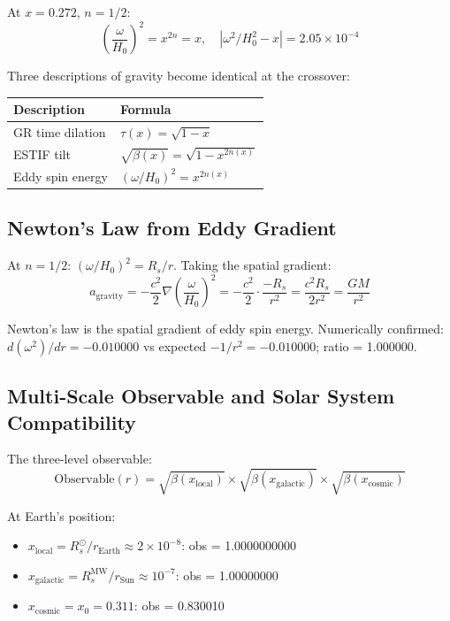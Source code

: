 \documentclass[12pt]{article}
\begin{document}
At $x = 0.272$, $n = 1/2$:
\begin{equation}
\left(\frac{\omega}{H_0}\right)^2 = x^{2n} = x, \quad |\omega^2/H_0^2 - x| = 2.05\times10^{-4}
\end{equation}

Three descriptions of gravity become identical at the crossover:
\begin{center}
\begin{tabular}{ll}
\toprule
Description & Formula \\
\midrule
GR time dilation & $\tau(x) = \sqrt{1-x}$ \\
ESTIF tilt & $\sqrt{\beta(x)} = \sqrt{1 - x^{2n(x)}}$ \\
Eddy spin energy & $(\omega/H_0)^2 = x^{2n(x)}$ \\
\bottomrule
\end{tabular}
\end{center}

\subsection{Newton's Law from Eddy Gradient}

At $n = 1/2$: $(\omega/H_0)^2 = R_s/r$. Taking the spatial gradient:
\begin{equation}
a_\text{gravity} = -\frac{c^2}{2}\nabla\!\left(\frac{\omega}{H_0}\right)^2
= -\frac{c^2}{2} \cdot \frac{-R_s}{r^2} = \frac{c^2 R_s}{2r^2} = \frac{GM}{r^2}
\end{equation}

Newton's law is the spatial gradient of eddy spin energy. Numerically confirmed:
$d(\omega^2)/dr = -0.010000$ vs expected $-1/r^2 = -0.010000$; ratio = 1.000000.

\subsection{Multi-Scale Observable and Solar System Compatibility}

The three-level observable:
\begin{equation}
\text{Observable}(r) = \sqrt{\beta(x_\text{local})} \times \sqrt{\beta(x_\text{galactic})} \times \sqrt{\beta(x_\text{cosmic})}
\end{equation}

At Earth's position:
\begin{itemize}
\item $x_\text{local} = R_s^\odot / r_\text{Earth} \approx 2\times10^{-8}$: obs = 1.0000000000
\item $x_\text{galactic} = R_s^\text{MW} / r_\text{Sun} \approx 10^{-7}$: obs = 1.00000000
\item $x_\text{cosmic} = x_0 = 0.311$: obs = 0.830010
\end{itemize}
\end{document}
